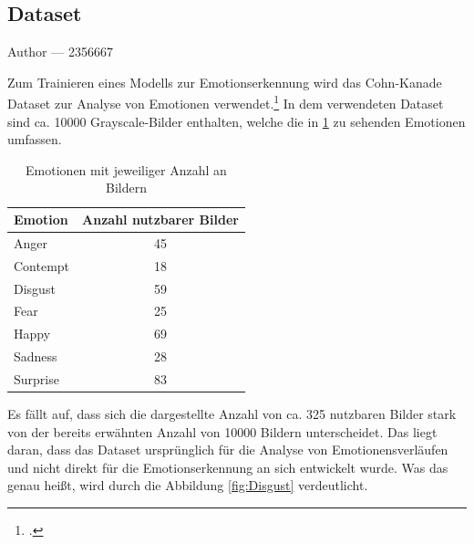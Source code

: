 \documentclass[12pt, a4paper]{report}
\makeatletter
\newcommand{\sectionauthor}[1]{%
  {\parindent0pt\vspace*{-5pt}%
  \large{Author --- }
  \linespread{1.1}\large\scshape#1%
  \par\nobreak\vspace*{35pt} }
  \@afterheading%
}
\makeatother
\begin{document}
\subsection{Dataset}
\label{firstDataSet}
\sectionauthor{2356667}
Zum Trainieren eines Modells zur Emotionserkennung wird das Cohn-Kanade Dataset zur Analyse von Emotionen verwendet.\footcite[Vgl.][]{CK} In dem verwendeten Dataset sind ca. 10000 Grayscale-Bilder enthalten, welche die in \ref{tab:ckemotions} zu sehenden Emotionen umfassen.
\begin{table}[h]
\centering
\begin{tabular}[t]{l|c}
Emotion & Anzahl nutzbarer Bilder \\
\hline
Anger & 45 \\
Contempt & 18 \\
Disgust & 59 \\
Fear & 25 \\
Happy & 69 \\
Sadness & 28 \\
Surprise & 83 \\
\hline
\end{tabular}
\caption{Emotionen mit jeweiliger Anzahl an Bildern}
\label{tab:ckemotions}
\end{table}
Es fällt auf, dass sich die dargestellte Anzahl von ca. 325 nutzbaren Bilder stark von der bereits erwähnten Anzahl von 10000 Bildern unterscheidet. Das liegt daran, dass das Dataset ursprünglich für die Analyse von Emotionensverläufen und nicht direkt für die Emotionserkennung an sich entwickelt wurde. Was das genau heißt, wird durch die Abbildung \ref{fig:Disgust} verdeutlicht.
\end{document}
